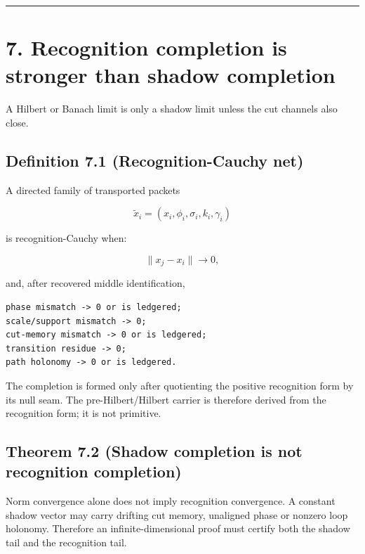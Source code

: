 \begin{center}\rule{0.5\linewidth}{0.5pt}\end{center}

\hypertarget{recognition-completion-is-stronger-than-shadow-completion}{%
\section{7. Recognition completion is stronger than shadow completion}\label{recognition-completion-is-stronger-than-shadow-completion}}

A Hilbert or Banach limit is only a shadow limit unless the cut channels also
close.

\hypertarget{definition-7.1-recognition-cauchy-net}{%
\subsection{Definition 7.1 (Recognition-Cauchy net)}\label{definition-7.1-recognition-cauchy-net}}

A directed family of transported packets

\[
\widetilde x_i=(x_i,\phi_i,\sigma_i,k_i,\gamma_i)
\]

is recognition-Cauchy when:

\[
\|x_j-x_i\|\longrightarrow0,
\]

and, after recovered middle identification,

\begin{verbatim}
phase mismatch -> 0 or is ledgered;
scale/support mismatch -> 0;
cut-memory mismatch -> 0 or is ledgered;
transition residue -> 0;
path holonomy -> 0 or is ledgered.
\end{verbatim}

The completion is formed only after quotienting the positive recognition form
by its null seam. The pre-Hilbert/Hilbert carrier is therefore derived from the
recognition form; it is not primitive.

\hypertarget{theorem-7.2-shadow-completion-is-not-recognition-completion}{%
\subsection{Theorem 7.2 (Shadow completion is not recognition completion)}\label{theorem-7.2-shadow-completion-is-not-recognition-completion}}

Norm convergence alone does not imply recognition convergence. A constant
shadow vector may carry drifting cut memory, unaligned phase or nonzero loop
holonomy. Therefore an infinite-dimensional proof must certify both the
shadow tail and the recognition tail.

